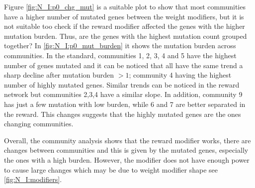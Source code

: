Figure \ref{fig:N_I:p0_chg_mut} is a suitable plot to show that most communities have a higher number of mutated genes between the weight modifiers, but it is not suitable too check if the reward modifier affected the genes with the higher mutation burden. Thus, are the genes with the highest mutation count grouped together? In \cref{fig:N_I:p0_mut_burden} it shows the mutation burden across communities. In the standard, communities 1, 2, 3, 4 and 5 have the highest number of genes mutated and it can be noticed that all have the same trend a sharp decline after mutation burden $>1$; community 4 having the highest number of highly mutated genes. Similar trends can be noticed in the reward network but communities 2,3,4 have a similar slope. In addition, community 9 has just a few mutation with low burden, while 6 and 7 are better separated in the reward. This changes suggests that the highly mutated genes are the ones changing communities.


Overall, the community analysis shows that the reward modifier works, there are changes between communities and this is given by the mutated genes, especially the ones with a high burden. However, the modifier does not have enough power to cause large changes which may be due to weight modifier shape see \cref{fig:N_I:modifiers}.


